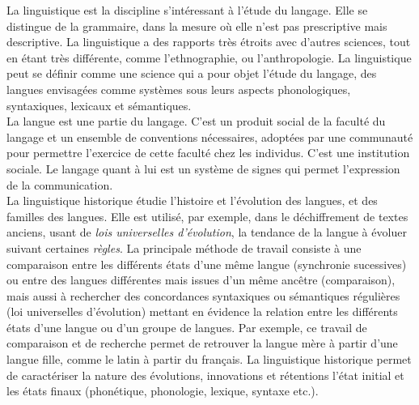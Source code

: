 \documentclass[12pt, french, twoside]{report}
\begin{document}
La linguistique est la discipline s'intéressant à l'étude du langage. Elle se distingue de la grammaire, dans la mesure où elle n'est pas prescriptive mais descriptive. La linguistique a des rapports très étroits avec d'autres sciences, tout en étant très différente, comme l'ethnographie, ou l'anthropologie. La linguistique peut se définir comme une science qui a pour objet l'étude du langage, des langues envisagées comme systèmes sous leurs aspects phonologiques, syntaxiques, lexicaux et sémantiques.\\

La langue est une partie du langage. C'est un produit social de la faculté du langage et un ensemble de conventions nécessaires, adoptées par une communauté pour permettre l'exercice de cette faculté chez les individus. C'est une institution sociale. Le langage quant à lui est un système de signes qui permet l'expression de la communication.\\


La linguistique historique étudie l'histoire et l'évolution des langues, et des familles des langues. Elle est utilisé, par exemple, dans le déchiffrement de textes anciens, usant de \textit{lois universelles d'évolution}, la tendance de la langue à évoluer suivant certaines \textit{règles}. La principale méthode de travail consiste à une comparaison entre les différents états d'une même langue (synchronie sucessives) ou entre des langues différentes mais issues d'un même ancêtre (comparaison), mais aussi à rechercher des concordances syntaxiques ou sémantiques régulières (loi universelles d'évolution) mettant en évidence la relation entre les différents états d'une langue ou d'un groupe de langues. Par exemple, ce travail de comparaison et de recherche permet de retrouver la langue mère à partir d'une langue fille, comme le latin à partir du français. La linguistique historique permet de caractériser la nature des évolutions, innovations et rétentions l'état initial et les états finaux (phonétique, phonologie, lexique, syntaxe etc.).\\
\end{document}
